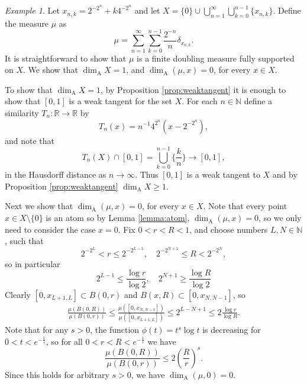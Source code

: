 \documentclass{PRM}
\newcommand{\field}[1]{\mathbb{#1}}
\newcommand{\N}{\field{N}}
\newcommand{\R}{\field{R}}
\theoremstyle{plain}
\theoremstyle{definition}
\theoremstyle{remark}
\newtheorem{example}[thm]{Example}
\begin{document}
\begin{example}
Let $x_{n,k}=2^{-2^n}+k4^{-2^n}$ and let $X=\{0\}\cup\bigcup_{n=1}^{\infty}\bigcup_{k=0}^{n-1}\{x_{n,k}\}$. Define the measure $\mu$ as 
\begin{equation*}
    \mu=\sum_{n=1}^{\infty}\sum_{k=0}^{n-1}\frac{2^{-n}}{n}\delta_{x_{n,k}}.
\end{equation*}
It is straightforward to show that $\mu$ is a finite doubling measure fully supported on $X$. We show that $\dim_{\mathrm{A}}X=1$, and $\dim_{\mathrm{A}}(\mu,x)=0$, for every $x\in X$.

To show that $\dim_{\mathrm{A}}X= 1$, by Proposition \ref{prop:weaktangent} it is enough to show that $[0,1]$ is a weak tangent for the set $X$. For each $n\in\N$ define a similarity $T_n:\R\to \R$ by
\begin{equation*}
    T_n(x)=n^{-1}4^{2^n}(x-2^{-2^n}),
\end{equation*}
and note that
\begin{equation*}
    T_n(X)\cap[0,1]=\bigcup_{k=0}^{n-1}\Big\{\frac{k}{n}\Big\}\to[0,1],
\end{equation*}
in the Hausdorff distance as $n\to\infty$. Thus $[0,1]$ is a weak tangent to $X$ and by Proposition \ref{prop:weaktangent} $\dim_{\mathrm{A}}X\geq 1$.

Next we show that $\dim_{\mathrm{A}}(\mu,x)=0$, for every $x\in X$. Note that every point $x\in X\setminus\{0\}$ is an atom so by Lemma \ref{lemma:atom}, $\dim_{\mathrm{A}}(\mu,x)=0$, so we only need to consider the case $x=0$. Fix $0<r<R<1$, and choose numbers $L,N\in\N$, such that
\begin{equation*}
    2^{-2^L}< r \leq 2^{-2^{L-1}}, \quad2^{-2^{N+1}}\leq R < 2^{-2^{N}},
\end{equation*}
so in particular
\begin{equation*}
    2^{L-1}\leq\frac{\log r}{\log 2},\quad 2^{N+1}\geq\frac{\log R}{\log 2}
\end{equation*}
Clearly $[0,x_{L+1,L}]\subset B(0,r)$ and $B(x,R)\subset [0,x_{N,N-1}]$, so
\begin{align*}
    \frac{\mu(B(0,R))}{\mu(B(0,r))}\leq\frac{\mu([0,x_{N,N-1}])}{\mu([0,x_{L+1,L}])}\leq 2^{L-N+1}\leq 2\frac{\log r}{\log R}.
\end{align*}
Note that for any $s>0$, the function $\phi(t)=t^s\log t$ is decreasing for  $0<t<e^{-\frac{1}{s}}$, so for all $0<r<R<e^{-\frac{1}{s}}$ we have
\begin{equation*}
    \frac{\mu(B(0,R))}{\mu(B(0,r))}\leq 2\left(\frac{R}{r}\right)^s.
\end{equation*}
Since this holds for arbitrary $s>0$, we have $\dim_{\mathrm{A}}(\mu,0)=0$.
\end{example}
\end{document}
